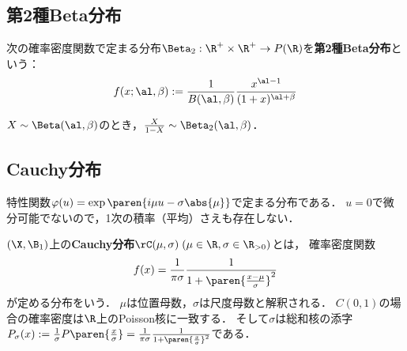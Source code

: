 \documentclass[uplatex,dvipdfmx]{jsreport}
\begin{document}
\subsection{第2種Beta分布}

\begin{definition}
    次の確率密度関数で定まる分布$\Beta_2:\R^+\times\R^+\to P(\R)$を\textbf{第2種Beta分布}という：
    \[f(x;\al,\beta):=\frac{1}{B(\al,\beta)}\frac{x^{\al-1}}{(1+x)^{\al+\beta}}\]
\end{definition}

\begin{proposition}
    $X\sim\Beta(\al,\beta)$のとき，$\frac{X}{1-X}\sim\Beta_2(\al,\beta)$．
\end{proposition}

\subsection{Cauchy分布}

\begin{tcolorbox}[colframe=ForestGreen, colback=ForestGreen!10!white,breakable,colbacktitle=ForestGreen!40!white,coltitle=black,fonttitle=\bfseries\sffamily,
title=]
    特性関数$\varphi(u)=\exp\paren{i\mu u-\sigma\abs{\mu}}$で定まる分布である．
    $u=0$で微分可能でないので，1次の積率（平均）さえも存在しない．
\end{tcolorbox}

\begin{definition}
    $(\X,\B_1)$上の\textbf{Cauchy分布}$\rC(\mu,\sigma)\;(\mu\in\R,\sigma\in\R_{>0})$とは，
    確率密度関数
    \[f(x)=\frac{1}{\pi\sigma}\frac{1}{1+\paren{\frac{x-\mu}{\sigma}}^2}\]
    が定める分布をいう．
    $\mu$は位置母数，$\sigma$は尺度母数と解釈される．
    $C(0,1)$の場合の確率密度は$\R$上のPoisson核に一致する．
    そして$\sigma$は総和核の添字$P_\sigma(x):=\frac{1}{\sigma}P\paren{\frac{x}{\sigma}}=\frac{1}{\pi\sigma}\frac{1}{1+\paren{\frac{x}{\sigma}}^2}$である．
\end{definition}
\end{document}
